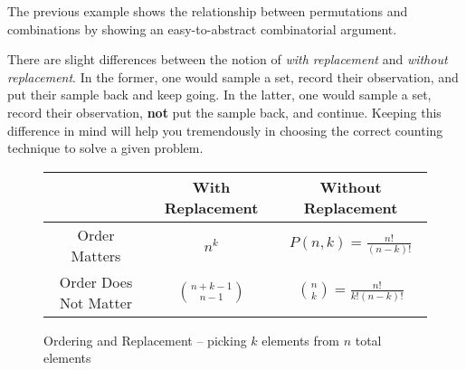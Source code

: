 \documentclass[main.tex]{subfiles}
\begin{document}
\begin{rem}
	The previous example shows the relationship between permutations and combinations by showing an easy-to-abstract combinatorial argument.
\end{rem}

There are slight differences between the notion of \textit{with replacement} and \textit{without replacement}. In the former, one would sample a set, record their observation, and put their sample back and keep going. In the latter, one would sample a set, record their observation, \textbf{not} put the sample back, and continue. Keeping this difference in mind will help you tremendously in choosing the correct counting technique to solve a given problem.


\begin{figure}[H]
	\centering
	\begin{tabular}{ccc}
		& With Replacement & Without Replacement \\
		\midrule
		Order Matters & \(n^k\) & \(P(n,k) = \frac{n!}{(n-k)!}\) \\
		\midrule
		Order Does Not Matter & \(\binom{n+k-1}{n-1}\) & \(\binom{n}{k} = \frac{n!}{k!(n-k)!}\) \\
	\end{tabular}
	\caption{Ordering and Replacement -- picking \(k\) elements from \(n\) total elements}
\end{figure}
\end{document}
